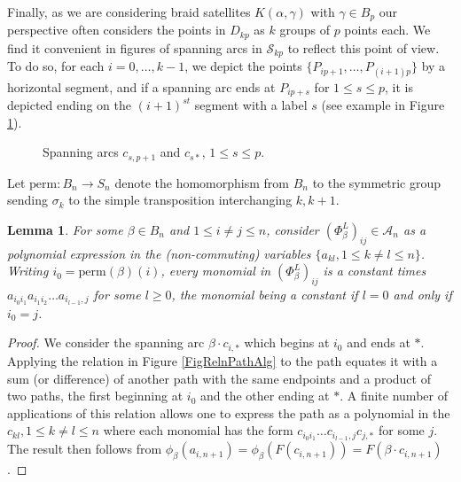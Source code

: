 \documentclass[11pt]{amsart}
\def\A{{\mathcal A}}
\def\s{{\sigma}}
\newtheorem{lem}[thm]{Lemma}
\theoremstyle{definition}
\begin{document}
  Finally, as we are considering braid satellites $K(\alpha,\gamma)$ with $\gamma\in B_p$ our perspective often considers the points in $D_{kp}$ as $k$ groups of $p$ points each. We find it convenient in figures of spanning arcs in $\mathscr S_{kp}$ to reflect this point of view. To do so, for each $i=0,\ldots,k-1$, we depict the points $\{P_{ip+1},\ldots, P_{(i+1)p}\}$ by a horizontal segment, and if a spanning arc ends at $P_{ip+s}$ for $1\le s\le p$, it is depicted ending on the $(i+1)^{st}$ segment with a label $s$ (see example in Figure \ref{FigExSpanArckp}).

  \begin{figure}[ht]
      \caption{Spanning arcs $c_{s,p+1}$ and $c_{s\ast}$, $1\le s\le p$.}
      \label{FigExSpanArckp}
    \end{figure}

  Let $\text{perm}:B_n\to S_n$ denote the homomorphism from $B_n$ to the symmetric group sending $\s_k$ to the simple transposition interchanging $k, k+1$.

  \begin{lem} For some $\beta\in B_n$ and $1\le i\ne j\le n$, consider $(\Phi_\beta^L)_{ij}\in \A_n$ as a polynomial expression in the (non-commuting) variables $\{a_{kl}, 1\le k\ne l\le n\}$. Writing $i_0=\text{perm}(\beta)(i)$, every monomial in $(\Phi_\beta^L)_{ij}$ is a constant times $a_{i_0i_1}a_{i_1i_2}\ldots a_{i_{l-1},j}$ for some $l\ge 0$, the monomial being a constant if $l=0$ and only if $i_0=j$.
  \label{lem:monomial}
  \end{lem}
  \begin{proof}We consider the spanning arc $\beta\cdot c_{i,\ast}$ which begins at $i_0$ and ends at $\ast$. Applying the relation in Figure \ref{FigRelnPathAlg} to the path equates it with a sum (or difference) of another path with the same endpoints and a product of two paths, the first beginning at $i_0$ and the other ending at $\ast$. A finite number of applications of this relation allows one to express the path as a polynomial in the $c_{kl}, 1\le k\ne l\le n$ where each monomial has the form $c_{i_0i_1}\ldots c_{i_{l-1},j}c_{j,\ast}$ for some $j$. The result then follows from $\phi_\beta(a_{i,n+1}) = \phi_\beta(F(c_{i,n+1})) = F(\beta\cdot c_{i,n+1})$.
  \end{proof}
\end{document}

